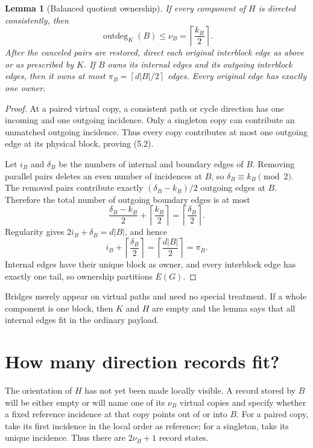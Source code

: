 \documentclass[11pt]{article}
\newtheorem{lemma}[theorem]{Lemma}
\theoremstyle{definition}
\theoremstyle{remark}
\newcommand{\outdeg}{\operatorname{outdeg}}
\newcommand{\ceil}[1]{\left\lceil #1\right\rceil}
\begin{document}
\begin{lemma}[Balanced quotient ownership]
\label{lem:ownership}
If every component of $H$ is directed consistently, then
\[
                       \outdeg_K(B)\le\nu_B
                         =\ceil{\frac{k_B}{2}}.                 \tag{5.2}
\]
After the canceled pairs are restored, direct each original interblock edge
as above or as prescribed by $K$.  If $B$ owns its internal edges and its
outgoing interblock edges, then it owns at most $\pi_B=\ceil{d|B|/2}$ edges.
Every original edge has exactly one owner.
\end{lemma}

\begin{proof}
At a paired virtual copy, a consistent path or cycle direction has one
incoming and one outgoing incidence.  Only a singleton copy can contribute
an unmatched outgoing incidence.  Thus every copy contributes at most one
outgoing edge at its physical block, proving (5.2).

Let $i_B$ and $\delta_B$ be the numbers of internal and boundary edges of
$B$.  Removing parallel pairs deletes an even number of incidences at $B$,
so $\delta_B\equiv k_B\pmod2$.  The removed pairs contribute exactly
$(\delta_B-k_B)/2$ outgoing edges at $B$.  Therefore the total number of
outgoing boundary edges is at most
\[
 \frac{\delta_B-k_B}{2}+\ceil{\frac{k_B}{2}}
   =\ceil{\frac{\delta_B}{2}}.                                \tag{5.3}
\]
Regularity gives $2i_B+\delta_B=d|B|$, and hence
\[
 i_B+\ceil{\frac{\delta_B}{2}}
   =\ceil{\frac{d|B|}{2}}=\pi_B.                              \tag{5.4}
\]
Internal edges have their unique block as owner, and every interblock edge
has exactly one tail, so ownership partitions $E(G)$.
\end{proof}

Bridges merely appear on virtual paths and need no special treatment.  If a
whole component is one block, then $K$ and $H$ are empty and the lemma says
that all internal edges fit in the ordinary payload.

\section{How many direction records fit?}
\label{sec:capacity}

The orientation of $H$ has not yet been made locally visible.  A record
stored by $B$ will be either empty or will name one of its $\nu_B$ virtual
copies and specify whether a fixed reference incidence at that copy points
out of or into $B$.  For a paired copy, take its first incidence in the local
order as reference; for a singleton, take its unique incidence.  Thus there
are $2\nu_B+1$ record states.
\end{document}
